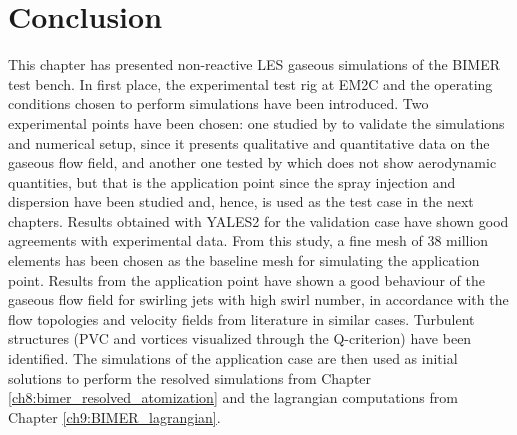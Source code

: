 \section{Conclusion}

This chapter has presented non-reactive LES gaseous simulations of the BIMER test bench. In first place, the experimental test rig at EM2C and the operating conditions chosen to perform simulations have been introduced. Two experimental points have been chosen: one studied by  to validate the simulations and numerical setup, since it presents qualitative and quantitative data on the gaseous flow field, and another one tested by  which does not show aerodynamic quantities, but that is the application point since the spray injection and dispersion have been studied and, hence, is used as the test case in the next chapters. Results obtained with YALES2 for the validation case have shown good agreements with experimental data. From this study, a fine mesh of 38 million elements has been chosen as the baseline mesh for simulating the application point. Results from the application point have shown a good behaviour of the gaseous flow field for swirling jets with high swirl number, in accordance with the flow topologies and velocity fields from literature in similar cases. Turbulent structures (PVC and vortices visualized through the Q-criterion) have been identified. The simulations of the application case are then used as initial solutions to perform the resolved simulations from Chapter \ref{ch8:bimer_resolved_atomization} and the lagrangian computations from Chapter \ref{ch9:BIMER_lagrangian}.

%